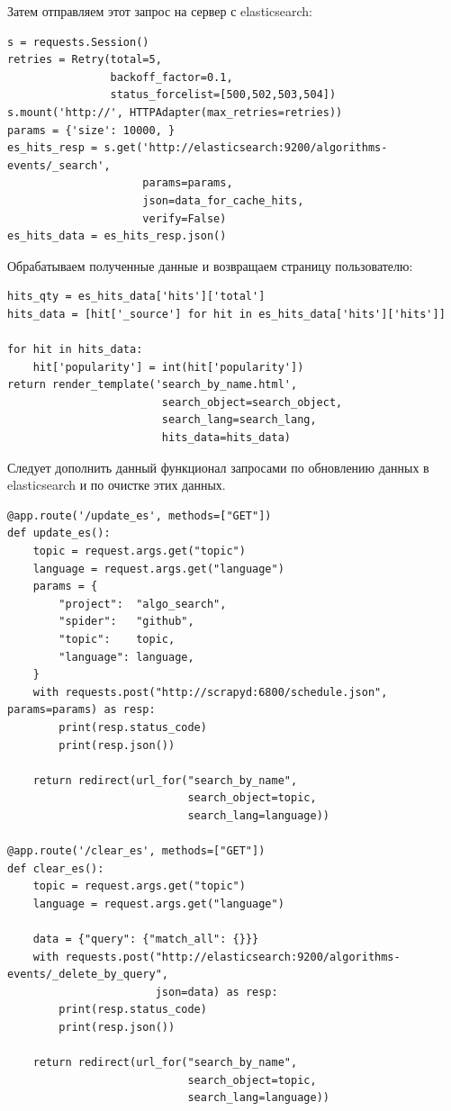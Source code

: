 Затем отправляем этот запрос на сервер с elasticsearch:
\begin{verbatim}
s = requests.Session()
retries = Retry(total=5,
                backoff_factor=0.1,
                status_forcelist=[500,502,503,504])
s.mount('http://', HTTPAdapter(max_retries=retries))
params = {'size': 10000, }
es_hits_resp = s.get('http://elasticsearch:9200/algorithms-events/_search',
                     params=params,
                     json=data_for_cache_hits,
                     verify=False)
es_hits_data = es_hits_resp.json()
\end{verbatim}

Обрабатываем полученные данные и возвращаем страницу пользователю:
\begin{verbatim}
hits_qty = es_hits_data['hits']['total']
hits_data = [hit['_source'] for hit in es_hits_data['hits']['hits']]

for hit in hits_data:
    hit['popularity'] = int(hit['popularity'])
return render_template('search_by_name.html',
                        search_object=search_object,
                        search_lang=search_lang,
                        hits_data=hits_data)
\end{verbatim}

Следует дополнить данный функционал запросами по обновлению данных в
elasticsearch и по очистке этих данных.
\begin{verbatim}
@app.route('/update_es', methods=["GET"])
def update_es():
    topic = request.args.get("topic")
    language = request.args.get("language")
    params = {
        "project":  "algo_search",
        "spider":   "github",
        "topic":    topic,
        "language": language,
    }
    with requests.post("http://scrapyd:6800/schedule.json", params=params) as resp:
        print(resp.status_code)
        print(resp.json())

    return redirect(url_for("search_by_name",
                            search_object=topic,
                            search_lang=language))

@app.route('/clear_es', methods=["GET"])
def clear_es():
    topic = request.args.get("topic")
    language = request.args.get("language")

    data = {"query": {"match_all": {}}}
    with requests.post("http://elasticsearch:9200/algorithms-events/_delete_by_query",
                       json=data) as resp:
        print(resp.status_code)
        print(resp.json())

    return redirect(url_for("search_by_name",
                            search_object=topic,
                            search_lang=language))
\end{verbatim}

